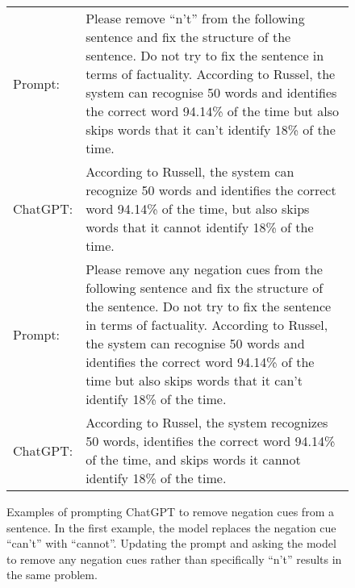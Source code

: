 \begin{figure*}
\centering
\begin{tabularx}{\textwidth}{l X}
\toprule
Prompt: & Please remove ``n't'' from the following sentence and fix the structure of the sentence. Do not try to fix the sentence in terms of factuality. According to Russel, the system can recognise 50 words and identifies the correct word 94.14\% of the time but also skips words that it can't identify 18\% of the time. \\
ChatGPT: & According to Russell, the system can recognize 50 words and identifies the correct word 94.14\% of the time, but also skips words that it cannot identify 18\% of the time. \\
\midrule
Prompt: & Please remove any negation cues from the following sentence and fix the structure of the sentence. Do not try to fix the sentence in terms of factuality. According to Russel, the system can recognise 50 words and identifies the correct word 94.14\% of the time but also skips words that it can't identify 18\% of the time. \\
ChatGPT: & According to Russel, the system recognizes 50 words, identifies the correct word 94.14\% of the time, and skips words it cannot identify 18\% of the time. \\
\bottomrule
\end{tabularx}
\caption{
        Examples of prompting ChatGPT to remove negation cues from a sentence.
        In the first example, the model replaces the negation cue ``can't'' with ``cannot''. 
        Updating the prompt and asking the model to remove any negation cues rather than specifically ``n't'' results in the same problem.
        \label{tab:chatgpt-remove}
    }
\end{figure*}

